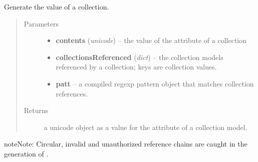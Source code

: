 \documentclass[letterpaper,10pt,english]{sphinxmanual}
\begin{document}

\begin{fulllineitems}
\label{api:onlinelinguisticdatabase.controllers.oldcollections.generateContentsUnpacked}
Generate the  value of a collection.
\begin{quote}\begin{description}
\item[{Parameters}] \leavevmode\begin{itemize}
\item {} 
\textbf{contents} (\emph{unicode}) -- the value of the  attribute of a collection

\item {} 
\textbf{collectionsReferenced} (\emph{dict}) -- the collection models referenced by a
collection; keys are collection  values.

\item {} 
\textbf{patt} -- a compiled regexp pattern object that matches collection references.

\end{itemize}

\item[{Returns}] \leavevmode
a unicode object as a value for the  attribute
of a collection model.

\end{description}\end{quote}

\begin{notice}{note}{Note:}
Circular, invalid and unauthorized reference chains are caught in the
generation of .
\end{notice}

\end{fulllineitems}

\end{document}
